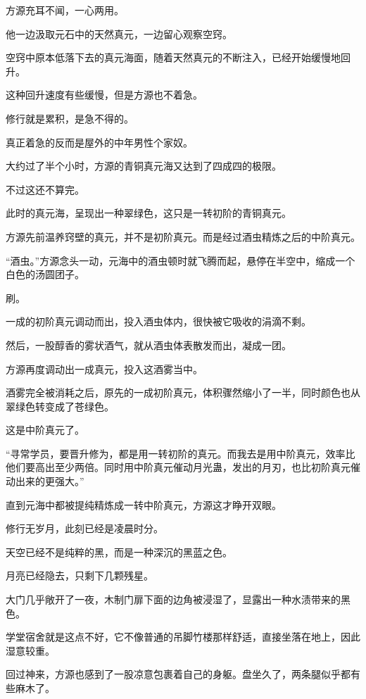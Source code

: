
\begin{this_body}

方源充耳不闻，一心两用。

他一边汲取元石中的天然真元，一边留心观察空窍。

空窍中原本低落下去的真元海面，随着天然真元的不断注入，已经开始缓慢地回升。

这种回升速度有些缓慢，但是方源也不着急。

修行就是累积，是急不得的。

真正着急的反而是屋外的中年男性个家奴。

大约过了半个小时，方源的青铜真元海又达到了四成四的极限。

不过这还不算完。

此时的真元海，呈现出一种翠绿色，这只是一转初阶的青铜真元。

方源先前温养窍壁的真元，并不是初阶真元。而是经过酒虫精炼之后的中阶真元。

“酒虫。”方源念头一动，元海中的酒虫顿时就飞腾而起，悬停在半空中，缩成一个白色的汤圆团子。

刷。

一成的初阶真元调动而出，投入酒虫体内，很快被它吸收的涓滴不剩。

然后，一股醇香的雾状酒气，就从酒虫体表散发而出，凝成一团。

方源再度调动出一成真元，投入这酒雾当中。

酒雾完全被消耗之后，原先的一成初阶真元，体积骤然缩小了一半，同时颜色也从翠绿色转变成了苍绿色。

这是中阶真元了。

“寻常学员，要晋升修为，都是用一转初阶的真元。而我去是用中阶真元，效率比他们要高出至少两倍。同时用中阶真元催动月光蛊，发出的月刃，也比初阶真元催动出来的更强大。”

直到元海中都被提纯精炼成一转中阶真元，方源这才睁开双眼。

修行无岁月，此刻已经是凌晨时分。

天空已经不是纯粹的黑，而是一种深沉的黑蓝之色。

月亮已经隐去，只剩下几颗残星。

大门几乎敞开了一夜，木制门扉下面的边角被浸湿了，显露出一种水渍带来的黑色。

学堂宿舍就是这点不好，它不像普通的吊脚竹楼那样舒适，直接坐落在地上，因此湿意较重。

回过神来，方源也感到了一股凉意包裹着自己的身躯。盘坐久了，两条腿似乎都有些麻木了。


\end{this_body}
